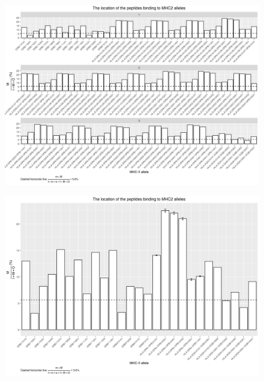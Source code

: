 \documentclass{article}
\begin{document}
\begin{figure}[ht]
  \includegraphics[width=\textwidth]{figure_1.png}
  \label{fig:1}
\end{figure}

\begin{figure}[ht]
  \includegraphics[width=\textwidth]{figure_1_5.png}
  \label{fig:1_5}
\end{figure}
\end{document}
